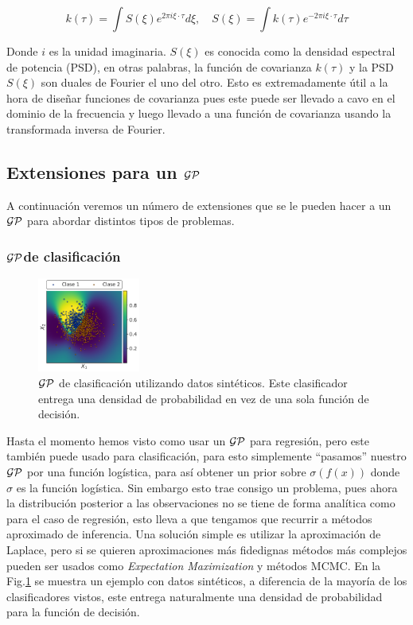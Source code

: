\begin{equation}\label{eq:gp_spectral}
	k(\tau) = \int S(\xi)e^{2\pi i \xi \cdot \tau} d\xi, \quad S(\xi)=\int k(\tau)e^{-2\pi i \xi \cdot \tau} d\tau
\end{equation}

Donde $i$ es la unidad imaginaria. $S(\xi)$ es conocida como la densidad espectral de potencia (PSD), en otras palabras, la función de covarianza $k(\tau)$ y la PSD $S(\xi)$ son duales de Fourier el uno del otro. Esto es extremadamente útil a la hora de diseñar funciones de covarianza pues este puede ser llevado a cavo en el dominio de la frecuencia y luego llevado a una función de covarianza usando la transformada inversa de Fourier.

\subsection{Extensiones para un \texorpdfstring{$\mathcal{GP}$}{GP}}
A continuación veremos un número de extensiones que se le pueden hacer a un $\mathcal{GP}$ para abordar distintos tipos de problemas.

\subsubsection{\texorpdfstring{$\mathcal{GP}$}{GP}de clasificación}

\begin{figure}
\centering
\includegraphics[width=0.3\textwidth]{img/cap8_classificacion}
\caption{$\mathcal{GP}$ de clasificación utilizando datos sintéticos. Este clasificador entrega una densidad de probabilidad en vez de una sola función de decisión.}\label{fig:gp_8}
\end{figure} 

Hasta el momento hemos visto como usar un $\mathcal{GP}$ para regresión, pero este también puede usado para clasificación, para esto simplemente ``pasamos'' nuestro $\mathcal{GP}$ por una función logística, para así obtener un prior sobre $\sigma\left(f(x)\right)$ donde $\sigma$ es la función logística. Sin embargo esto trae consigo un problema, pues ahora la distribución posterior a las observaciones no se tiene de forma analítica como para el caso de regresión, esto lleva a que tengamos que recurrir a métodos aproximado de inferencia. Una solución simple es utilizar la aproximación de Laplace, pero si se quieren aproximaciones más fidedignas métodos más complejos pueden ser usados como \textit{Expectation Maximization} y métodos MCMC. En la Fig.\ref{fig:gp_8} se muestra un ejemplo con datos sintéticos, a diferencia de la mayoría de los clasificadores vistos, este entrega naturalmente una densidad de probabilidad para la función de decisión.\\

